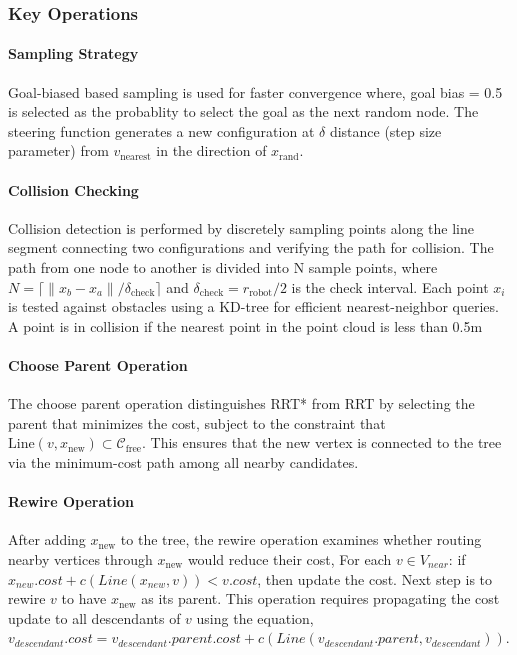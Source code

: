 \documentclass[11pt]{article}
\newcommand{\Cfree}{\mathcal{C}_{\text{free}}}
\newcommand{\vnearest}{v_{\text{nearest}}}
\newcommand{\xrand}{x_{\text{rand}}}
\newcommand{\xnew}{x_{\text{new}}}
\begin{document}
\subsubsection{Key Operations}

\paragraph{Sampling Strategy}
Goal-biased based sampling is used for faster convergence where, goal bias = 0.5 is selected as the probablity to select the goal as the next random node. The steering function generates a new configuration at $\delta$ distance (step size parameter) from $\vnearest$ in the direction of $\xrand$.


\paragraph{Collision Checking}
Collision detection is performed by discretely sampling points along the line segment connecting two configurations and verifying the path for collision. The path from one node to another is divided into N sample points, where $N = \lceil \|x_b - x_a\| / \delta_{\text{check}} \rceil$ and $\delta_{\text{check}} = r_{\text{robot}}/2$ is the check interval. Each point $x_i$ is tested against obstacles using a KD-tree for efficient nearest-neighbor queries. A point is in collision if the nearest point in the point cloud is less than 0.5m

\paragraph{Choose Parent Operation}
The choose parent operation distinguishes RRT* from RRT by selecting the parent that minimizes the cost, subject to the constraint that $\text{Line}(v, \xnew) \subset \Cfree$. This ensures that the new vertex is connected to the tree via the minimum-cost path among all nearby candidates.

\paragraph{Rewire Operation}
After adding $\xnew$ to the tree, the rewire operation examines whether routing nearby vertices through $\xnew$ would reduce their cost,
For each $v \in V_{near}$: if $x_{new}.cost + c(Line(x_{new}, v)) < v.cost$, then update the cost.
Next step is to  rewire $v$ to have $\xnew$ as its parent. This operation requires propagating the cost update to all descendants of $v$ using the equation,
$v_{descendant}.cost= v_{descendant}.parent.cost + c(Line(v_{descendant}.parent, v_{descendant}))$.
\end{document}
